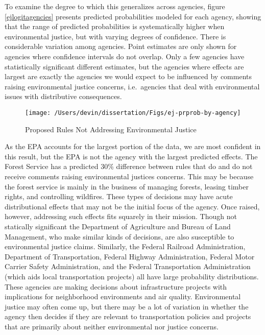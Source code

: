 \documentclass[
      12pt,
        ]{article}
\begin{document}
To examine the degree to which this generalizes across agencies, figure
\ref{ejlogitagencies} presents predicted probabilities modeled
for each agency, showing that the range of predicted probabilities is
systematically higher when environmental justice, but with varying
degrees of confidence. There is considerable variation among agencies.
Point estimates are only shown for agencies where confidence intervals
do not overlap. Only a few agencies have statistically significant
different estimates, but the agencies where effects are largest are
exactly the agencies we would expect to be influenced by comments
raising environmental justice concerns, i.e.~agencies that deal with
environmental issues with distributive consequences.

\begin{figure}

{\centering \texttt{[image: /Users/devin/dissertation/Figs/ej-prprob-by-agency]} 

}

\caption{Proposed Rules Not Addressing Environmental Justice}\label{fig:ejlogitagencies}
\end{figure}

As the EPA accounts for the largest portion of the data, we are most
confident in this result, but the EPA is not the agency with the largest
predicted effects. The Forest Service has a predicted 30\% difference
between rules that do and do not receive comments raising environmental
justices concerns. This may be because the forest service is mainly in
the business of managing forests, leasing timber rights, and controlling
wildfires. These types of decisions may have acute distributional
effects that may not be the initial focus of the agency. Once raised,
however, addressing such effects fits squarely in their mission. Though
not statically significant the Department of Agriculture and Bureau of
Land Management, who make similar kinds of decisions, are also
susceptible to environmental justice claims. Similarly, the Federal
Railroad Administration, Department of Transportation, Federal Highway
Administration, Federal Motor Carrier Safety Administration, and the
Federal Transportation Administration (which aids local transportation
projects) all have large probability distributions. These agencies are
making decisions about infrastructure projects with implications for
neighborhood environments and air quality. Environmental justice may
often come up, but there may be a lot of variation in whether the agency
then decides if they are relevant to transportation policies and
projects that are primarily about neither environmental nor justice
concerns.
\end{document}
